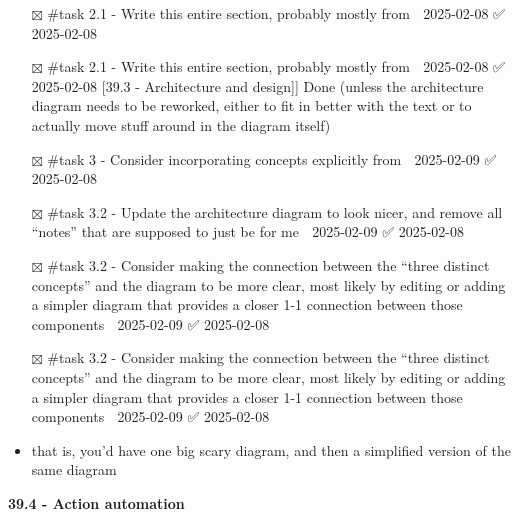 \begin{itemize}
\item[$\boxtimes$]
  \#task 2.1 - Write this entire section, probably mostly from
  \cite{grajedaAvailabilityDatasetsDigital2017} 📅 2025-02-08 ✅
  2025-02-08
\item[$\boxtimes$]
  \#task 2.1 - Write this entire section, probably mostly from
  \cite{grajedaAvailabilityDatasetsDigital2017} 📅 2025-02-08 ✅
  2025-02-08 {[}39.3 - Architecture and design{]}{]} Done (unless the
  architecture diagram needs to be reworked, either to fit in better
  with the text or to actually move stuff around in the diagram itself)
\item[$\boxtimes$]
  \#task 3 - Consider incorporating concepts explicitly from
  \cite{horsmanDatasetConstructionChallenges2021} 📅 2025-02-09 ✅
  2025-02-08
\item[$\boxtimes$]
  \#task 3.2 - Update the architecture diagram to look nicer, and remove
  all ``notes'' that are supposed to just be for me 📅 2025-02-09 ✅
  2025-02-08
\item[$\boxtimes$]
  \#task 3.2 - Consider making the connection between the ``three
  distinct concepts'' and the diagram to be more clear, most likely by
  editing or adding a simpler diagram that provides a closer 1-1
  connection between those components 📅 2025-02-09 ✅ 2025-02-08
\item[$\boxtimes$]
  \#task 3.2 - Consider making the connection between the ``three
  distinct concepts'' and the diagram to be more clear, most likely by
  editing or adding a simpler diagram that provides a closer 1-1
  connection between those components 📅 2025-02-09 ✅ 2025-02-08
\item
  that is, you'd have one big scary diagram, and then a simplified
  version of the same diagram
\end{itemize}

\textbf{39.4 - Action automation}

